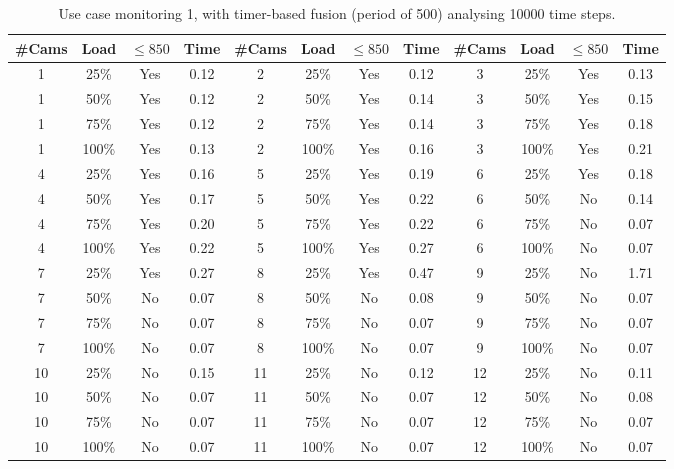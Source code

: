 \documentclass{article}
\begin{document}
\begin{table}
\centering
\begin{tabular}{|c|c|c|c|c|c|c|c|c|c|c|c|}
\hline
\#Cams & Load & $\leq 850$ & Time & \#Cams & Load & $\leq 850$ & Time & \#Cams & Load & $\leq 850$ & Time\\
\hline
1 & 25\% & Yes & 0.12 & 2 & 25\% & Yes & 0.12 & 3 & 25\% & Yes & 0.13\\
1 & 50\% & Yes & 0.12 & 2 & 50\% & Yes & 0.14 & 3 & 50\% & Yes & 0.15\\
1 & 75\% & Yes & 0.12 & 2 & 75\% & Yes & 0.14 & 3 & 75\% & Yes & 0.18\\
1 & 100\% & Yes & 0.13 & 2 & 100\% & Yes & 0.16 & 3 & 100\% & Yes & 0.21\\
\hline
4 & 25\% & Yes & 0.16 & 5 & 25\% & Yes & 0.19 & 6 & 25\% & Yes & 0.18\\
4 & 50\% & Yes & 0.17 & 5 & 50\% & Yes & 0.22 & 6 & 50\% & No & 0.14\\
4 & 75\% & Yes & 0.20 & 5 & 75\% & Yes & 0.22 & 6 & 75\% & No & 0.07\\
4 & 100\% & Yes & 0.22 & 5 & 100\% & Yes & 0.27 & 6 & 100\% & No & 0.07\\
\hline
7 & 25\% & Yes & 0.27 & 8 & 25\% & Yes & 0.47 & 9 & 25\% & No & 1.71\\
7 & 50\% & No & 0.07 & 8 & 50\% & No & 0.08 & 9 & 50\% & No & 0.07\\
7 & 75\% & No & 0.07 & 8 & 75\% & No & 0.07 & 9 & 75\% & No & 0.07\\
7 & 100\% & No & 0.07 & 8 & 100\% & No & 0.07 & 9 & 100\% & No & 0.07\\
\hline
10 & 25\% & No & 0.15 & 11 & 25\% & No & 0.12 & 12 & 25\% & No & 0.11\\
10 & 50\% & No & 0.07 & 11 & 50\% & No & 0.07 & 12 & 50\% & No & 0.08\\
10 & 75\% & No & 0.07 & 11 & 75\% & No & 0.07 & 12 & 75\% & No & 0.07\\
10 & 100\% & No & 0.07 & 11 & 100\% & No & 0.07 & 12 & 100\% & No & 0.07\\
\hline
\end{tabular}
\caption{Use case monitoring 1, with timer-based fusion (period of 500) analysing 10000 time steps.}
\end{table}
\end{document}

